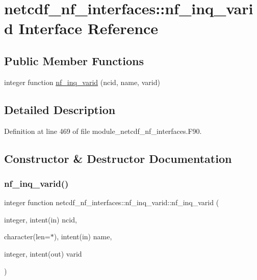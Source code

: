 \hypertarget{interfacenetcdf__nf__interfaces_1_1nf__inq__varid}{}\section{netcdf\+\_\+nf\+\_\+interfaces\+:\+:nf\+\_\+inq\+\_\+varid Interface Reference}
\label{interfacenetcdf__nf__interfaces_1_1nf__inq__varid}
\subsection*{Public Member Functions}
\begin{DoxyCompactItemize}
\item 
integer function \hyperlink{interfacenetcdf__nf__interfaces_1_1nf__inq__varid_ae802133608130bbffa4f0a4a3f83b903}{nf\+\_\+inq\+\_\+varid} (ncid, name, varid)
\end{DoxyCompactItemize}


\subsection{Detailed Description}


Definition at line 469 of file module\+\_\+netcdf\+\_\+nf\+\_\+interfaces.\+F90.



\subsection{Constructor \& Destructor Documentation}
\mbox{\label{interfacenetcdf__nf__interfaces_1_1nf__inq__varid_ae802133608130bbffa4f0a4a3f83b903}} 
\subsubsection{\texorpdfstring{nf\+\_\+inq\+\_\+varid()}{nf\_inq\_varid()}}
{\footnotesize\ttfamily integer function netcdf\+\_\+nf\+\_\+interfaces\+::nf\+\_\+inq\+\_\+varid\+::nf\+\_\+inq\+\_\+varid (\begin{DoxyParamCaption}\item[{integer, intent(in)}]{ncid,  }\item[{character(len=$\ast$), intent(in)}]{name,  }\item[{integer, intent(out)}]{varid }\end{DoxyParamCaption})}



